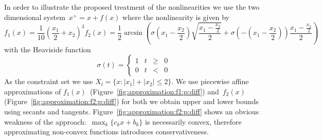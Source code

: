 \documentclass[final]{elsarticle}
\providecommand{\abs}[1]{\left|#1\right|}
\theoremstyle{remark}
\theoremstyle{definition}
\begin{document}
In order to illustrate the proposed treatment of the nonlinearities we use the two dimensional system~$x^+=x+f(x)$ where the nonlinearity is given by
%
\begin{subequations}
\begin{equation}
  f_1(x) = \frac{1}{10}\left(\frac{x_1}{2}+x_2\right)^3
\end{equation}
\begin{equation}
  f_2(x) = \frac{1}{2}\arcsin\left(\sigma\left(x_1-\frac{x_2}{2}\right)\sqrt{\frac{x_1-\frac{x_2}{2}}{2}} + \sigma\left(-\left(x_1-\frac{x_2}{2}\right)\right)\frac{x_1-\frac{x_2}{2}}{2} \right)
\end{equation}
\end{subequations}
%
with the Heaviside function
%
$$
  \sigma(t) = \left\{\begin{array}{crcl}1& t&\geq&0\\ 0 &t&<&0 \end{array}\right.
$$
%
As the constraint set we use $X_l = \{x:\abs{x_1}+\abs{x_2}\leq 2\}$.
%
We use piecewise affine approximations of $f_1(x)$~(Figure~\ref{fig:approximation:f1:p:diff}) and~$f_2(x)$ (Figure~\ref{fig:approximation:f2:p:diff})
for both we obtain upper and lower bounds using secants and tangents.
%
Figure~\ref{fig:approximation:f2:p:diff} shows an obvious weakness of the approach:~$\max_k\{c_k x+b_k\}$ is necessarily convex, therefore approximating non-convex functions introduces conservativeness.
\end{document}
